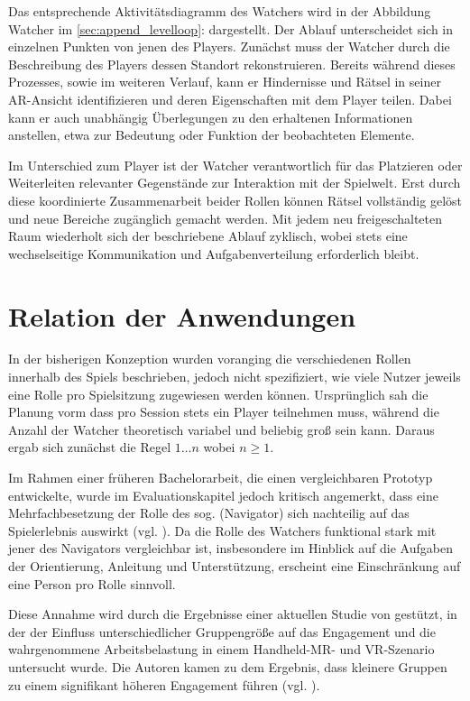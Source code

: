 Das entsprechende Aktivitätsdiagramm des Watchers wird in der Abbildung Watcher im \ref{sec:append_levelloop}:  dargestellt. Der Ablauf unterscheidet sich in einzelnen Punkten von jenen des Players. Zunächst muss der Watcher durch die Beschreibung des Players dessen Standort rekonstruieren. Bereits während dieses Prozesses, sowie im weiteren Verlauf, kann er Hindernisse und Rätsel in seiner \ac{AR}-Ansicht identifizieren und deren Eigenschaften mit dem Player teilen. Dabei kann er auch unabhängig Überlegungen zu den erhaltenen Informationen anstellen, etwa zur Bedeutung oder Funktion der beobachteten Elemente.

Im Unterschied zum Player ist der Watcher verantwortlich für das Platzieren oder Weiterleiten relevanter Gegenstände zur Interaktion mit der Spielwelt. Erst durch diese koordinierte Zusammenarbeit beider Rollen können Rätsel vollständig gelöst und neue Bereiche zugänglich gemacht werden. Mit jedem neu freigeschalteten Raum wiederholt sich der beschriebene Ablauf zyklisch, wobei stets eine wechselseitige Kommunikation und Aufgabenverteilung erforderlich bleibt.


\section{Relation der Anwendungen}

In der bisherigen Konzeption wurden voranging die verschiedenen Rollen innerhalb des Spiels beschrieben, jedoch nicht spezifiziert, wie viele Nutzer jeweils eine Rolle pro Spielsitzung zugewiesen werden können. Ursprünglich sah die Planung vorm dass pro Session stets ein Player teilnehmen muss, während die Anzahl der Watcher theoretisch variabel und beliebig groß sein kann. Daraus ergab sich zunächst die Regel $1\ldots n$ \quad wobei $n \geq 1$.

Im Rahmen einer früheren Bachelorarbeit, die einen vergleichbaren Prototyp entwickelte, wurde im Evaluationskapitel jedoch kritisch angemerkt, dass eine Mehrfachbesetzung der Rolle des sog.  (Navigator) sich nachteilig auf das Spielerlebnis auswirkt (vgl. \citealp[S. 34]{lotz_konzeption_2021}). Da die Rolle des Watchers funktional stark mit jener des Navigators vergleichbar ist, insbesondere im Hinblick auf die Aufgaben der Orientierung, Anleitung und Unterstützung, erscheint eine Einschränkung auf eine Person pro Rolle sinnvoll.

Diese Annahme wird durch die Ergebnisse einer aktuellen Studie von \cite{bautista_isaza_understanding_2024} gestützt, in der der Einfluss unterschiedlicher Gruppengröße auf das Engagement und die wahrgenommene Arbeitsbelastung in einem Handheld-\ac{MR}- und \ac{VR}-Szenario untersucht wurde. Die Autoren kamen zu dem Ergebnis, dass kleinere Gruppen zu einem signifikant höheren Engagement führen (vgl. \citealp[S. 197:22]{bautista_isaza_understanding_2024}).

